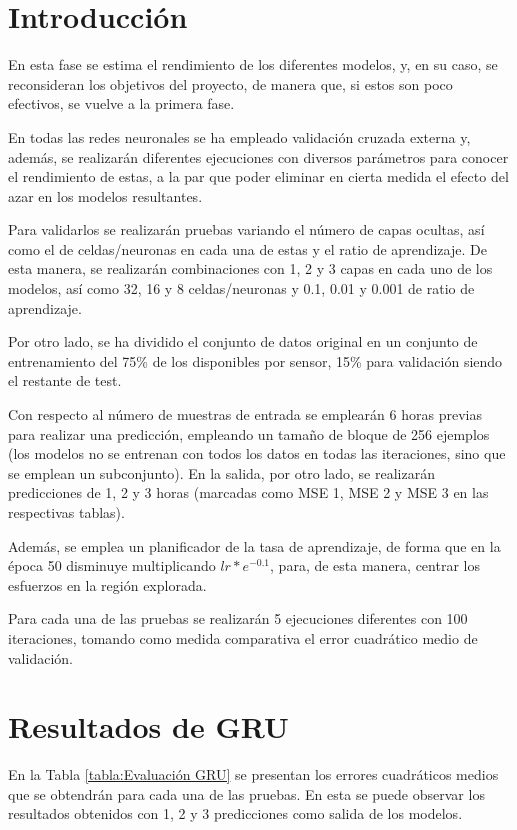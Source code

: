 
\section{Introducción}
En esta fase se estima el rendimiento de los diferentes modelos, y, en su caso, 
se reconsideran los objetivos del proyecto, de manera que, si estos son poco efectivos,
se vuelve a la primera fase.

En todas las redes neuronales se ha empleado validación cruzada externa y, además, se realizarán
diferentes ejecuciones con diversos parámetros para conocer el rendimiento de estas, a 
la par que poder eliminar en cierta medida el efecto del azar en los modelos 
resultantes.

Para validarlos se realizarán pruebas variando el número de capas
ocultas, así como el de celdas/neuronas en cada una de estas y el ratio de aprendizaje.
De esta manera, se realizarán combinaciones con 1, 2 y 3 capas en cada uno de los modelos, 
así como 32, 16 y 8 celdas/neuronas y 0.1, 0.01 y 0.001 de ratio de aprendizaje. 

Por otro lado, se ha dividido el conjunto de datos original en un conjunto de entrenamiento del 75\% de los disponibles
por sensor, 15\% para validación siendo el restante de test.

Con respecto al número de muestras de entrada se emplearán 6 horas previas para realizar
una predicción, empleando un tamaño de bloque de 256 ejemplos (los modelos 
no se entrenan con todos los datos en todas las iteraciones, sino que se emplean un subconjunto).
En la salida, por otro lado, se realizarán predicciones de 1, 2 y 3 horas (marcadas como MSE 1, MSE 2 y MSE 3 en las
respectivas tablas).

Además, se emplea un planificador de la tasa de aprendizaje, de forma
que en la época 50 disminuye multiplicando \(lr * e^{-0.1}\), para, de esta manera,
centrar los esfuerzos en la región explorada.

Para cada una de las pruebas se realizarán 5 ejecuciones diferentes con 100 iteraciones, 
tomando como medida comparativa el error cuadrático medio de validación.

\section{Resultados de GRU}
En la Tabla \ref{tabla:Evaluación GRU} se presentan los errores cuadráticos medios
que se obtendrán para cada una de las pruebas. En esta se puede observar los resultados obtenidos con 1, 2 y 3 predicciones 
como salida de los modelos. 

